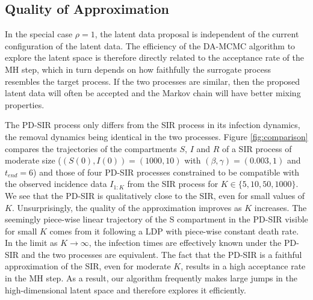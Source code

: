 \documentclass[11pt]{article}
\begin{document}
	\subsection{Quality of Approximation}
	\label{sec:qua}
	
	In the special case $\rho=1$, the latent data proposal is independent of the current configuration of the latent data. The efficiency of the DA-MCMC algorithm to explore the latent space is therefore directly related to the acceptance rate of the MH step, which in turn depends on how faithfully the surrogate process resembles the target process. If the two processes are similar, then the proposed latent data will often be accepted and the Markov chain will have better mixing properties.
	
	The PD-SIR process only differs from the SIR process in its infection dynamics, the removal dynamics being identical in the two processes. Figure \ref{fig:comparison} compares the trajectories of the compartments $S$, $I$ and $R$ of a SIR process of moderate size ($(S(0), I(0)) = (1000, 10)$ with $(\beta, \gamma) = (0.003, 1)$ and $t_{end} = 6$) and those of four PD-SIR processes constrained to be compatible with the observed incidence data $I_{1:K}$ from the SIR process for $K \in \{5, 10, 50, 1000\}$. We see that the PD-SIR is qualitatively close to the SIR, even for small values of $K$. Unsurprisingly, the quality of the approximation improves as $K$ increases. The seemingly piece-wise linear trajectory of the S compartment in the PD-SIR visible for small $K$ comes from it following a LDP with piece-wise constant death rate. In the limit as $K \rightarrow \infty$, the infection times are effectively known under the PD-SIR and the two processes are equivalent.
	The fact that the PD-SIR is a faithful approximation of the SIR, even for moderate $K$, results in a high acceptance rate in the MH step. As a result, our algorithm frequently makes large jumps in the high-dimensional latent space and therefore explores it efficiently. 
	
\end{document}
